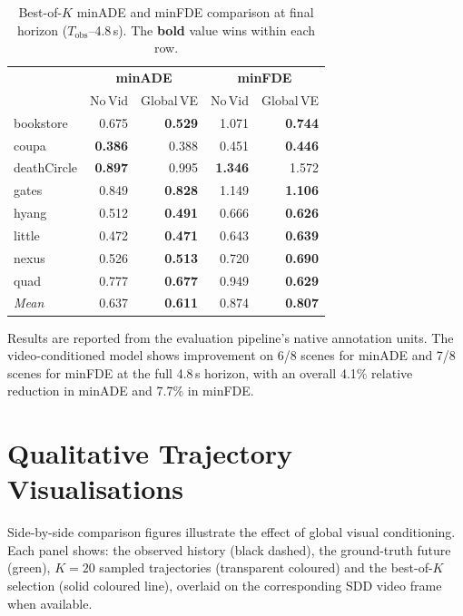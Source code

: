 \documentclass[11pt,a4paper]{article}
\begin{document}
\begin{table}[ht]
\centering
\caption{Best-of-$K$ minADE and minFDE comparison at final horizon ($T_{\mathrm{obs}}$--4.8\,s).  The \textbf{bold} value wins within each row.}
\label{tab:final}
\small
\begin{tabular}{@{}l r r r r@{}}
\toprule
 & \multicolumn{2}{c}{\textbf{minADE}} & \multicolumn{2}{c}{\textbf{minFDE}} \\
 & \multicolumn{1}{c}{No\,Vid} & \multicolumn{1}{c}{Global\,VE} & \multicolumn{1}{c}{No\,Vid} & \multicolumn{1}{c}{Global\,VE} \\
\midrule
bookstore     & 0.675 & \textbf{0.529} & 1.071 & \textbf{0.744} \\
coupa         & \textbf{0.386} & 0.388 & 0.451 & \textbf{0.446} \\
deathCircle   & \textbf{0.897} & 0.995 & \textbf{1.346} & 1.572 \\
gates         & 0.849 & \textbf{0.828} & 1.149 & \textbf{1.106} \\
hyang         & 0.512 & \textbf{0.491} & 0.666 & \textbf{0.626} \\
little        & 0.472 & \textbf{0.471} & 0.643 & \textbf{0.639} \\
nexus         & 0.526 & \textbf{0.513} & 0.720 & \textbf{0.690} \\
quad          & 0.777 & \textbf{0.677} & 0.949 & \textbf{0.629} \\
\midrule
\textit{Mean} & 0.637 & \textbf{0.611} & 0.874 & \textbf{0.807} \\
\bottomrule
\end{tabular}
\end{table}

Results are reported from the evaluation pipeline's native annotation units.  The video-conditioned model shows improvement on 6/8 scenes for minADE and 7/8 scenes for minFDE at the full 4.8\,s horizon, with an overall 4.1\% relative reduction in minADE and 7.7\% in minFDE.

\section{Qualitative Trajectory Visualisations}
\label{sec:qual}

Side-by-side comparison figures illustrate the effect of global visual conditioning.  Each panel shows: the observed history (black dashed), the ground-truth future (green), $K=20$ sampled trajectories (transparent coloured) and the best-of-$K$ selection (solid coloured line), overlaid on the corresponding SDD video frame when available.
\end{document}
